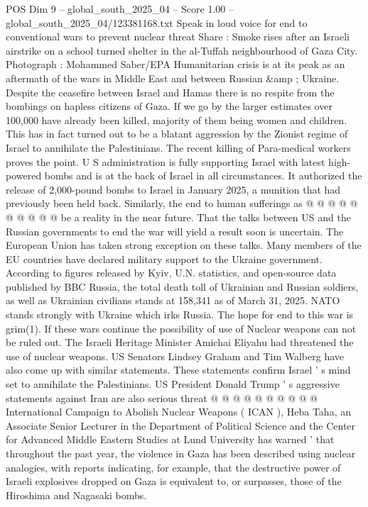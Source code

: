 \begin{textsample}{POS Dim 9 – global\_south\_2025\_04 – Score 1.00 – global\_south\_2025\_04/123381168.txt}  \label{ex:f9_pos_153}
Speak in loud voice for end to conventional wars to prevent nuclear threat Share : Smoke rises after an Israeli airstrike on a school turned shelter in the al-Tuffah neighbourhood of Gaza City.
Photograph : Mohammed Saber/EPA Humanitarian crisis is at its peak as an aftermath of the wars in Middle East and between Russian \&amp ; Ukraine.
Despite the ceasefire between Israel and Hamas there is no respite from the bombings on hapless citizens of Gaza.
If we go by the larger estimates over 100,000 have already been killed, majority of them being women and children.
This has in fact turned out to be a blatant aggression by the Zionist regime of Israel to annihilate the Palestinians.
The recent killing of Para-medical workers proves the point.
U S administration is fully supporting Israel with latest high-powered bombs and is at the back of Israel in all circumstances.
It authorized the release of 2,000-pound bombs to Israel in January 2025, a munition that had previously been held back.
Similarly, the end to human sufferings as @ @ @ @ @ @ @ @ @ @ be a reality in the near future.
That the talks between US and the Russian governments to end the war will yield a result soon is uncertain.
The European Union has taken strong exception on these talks.
Many members of the EU countries have declared military support to the Ukraine government.
According to figures released by Kyiv, U.N. statistics, and open-source data published by BBC Russia, the total death toll of Ukrainian and Russian soldiers, as well as Ukrainian civilians stands at 158,341 as of March 31, 2025.
NATO stands strongly with Ukraine which irks Russia.
The hope for end to this war is grim(1).
If these wars continue the possibility of use of Nuclear weapons can not be ruled out.
The Israeli Heritage Minister Amichai Eliyahu had threatened the use of nuclear weapons.
US Senators Lindsey Graham and Tim Walberg have also come up with similar statements.
These statements confirm Israel ' s mind set to annihilate the Palestinians.
US President Donald Trump ' s aggressive statements against Iran are also serious threat @ @ @ @ @ @ @ @ @ @ International Campaign to Abolish Nuclear Weapons ( ICAN ), Heba Taha, an Associate Senior Lecturer in the Department of Political Science and the Center for Advanced Middle Eastern Studies at Lund University has warned ' that throughout the past year, the violence in Gaza has been described using nuclear analogies, with reports indicating, for example, that the destructive power of Israeli explosives dropped on Gaza is equivalent to, or surpasses, those of the Hiroshima and Nagasaki bombs.

\end{textsample}
